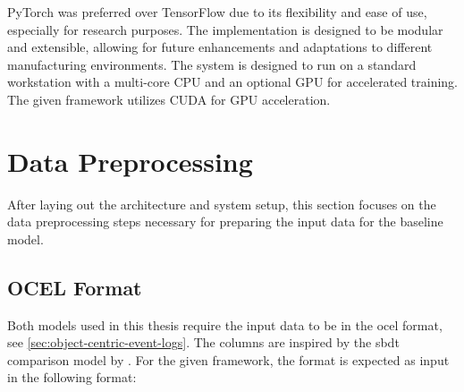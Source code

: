 PyTorch was preferred over TensorFlow due to its flexibility and ease of use, especially for research purposes. The implementation is designed to be modular and extensible, allowing for future enhancements and adaptations to different manufacturing environments.
The system is designed to run on a standard workstation with a multi-core CPU and an optional GPU for accelerated training. The given framework utilizes CUDA \autocite{NVIDIA_CUDA} for GPU acceleration.

\section*{Data Preprocessing}
\label{sec:event_log_processing}

After laying out the architecture and system setup, this section focuses on the data preprocessing steps necessary for preparing the input data for the baseline model.

\subsection{OCEL Format}

Both models used in this thesis require the input data to be in the \gls{ocel} format, see \autoref{sec:object-centric-event-logs}. The columns are inspired by the \gls{sbdt} comparison model by \textcite{schwede2024learning}. For the given framework, the format is expected as input in the following format:

